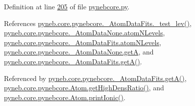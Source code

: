 Definition at line \hyperlink{pynebcore_8py_source_l00205}{205} of file \hyperlink{pynebcore_8py_source}{pynebcore.\+py}.



References \hyperlink{pynebcore_8py_source_l00171}{pyneb.\+core.\+pynebcore.\+\_\+\+Atom\+Data\+Fits.\+\_\+test\+\_\+lev()}, \hyperlink{pynebcore_8py_source_l00061}{pyneb.\+core.\+pynebcore.\+\_\+\+Atom\+Data\+None.\+atom\+N\+Levels}, \hyperlink{pynebcore_8py_source_l00148}{pyneb.\+core.\+pynebcore.\+\_\+\+Atom\+Data\+Fits.\+atom\+N\+Levels}, \hyperlink{pynebcore_8py_source_l00060}{pyneb.\+core.\+pynebcore.\+\_\+\+Atom\+Data\+None.\+get\+A}, and \hyperlink{pynebcore_8py_source_l00205}{pyneb.\+core.\+pynebcore.\+\_\+\+Atom\+Data\+Fits.\+get\+A()}.



Referenced by \hyperlink{pynebcore_8py_source_l00205}{pyneb.\+core.\+pynebcore.\+\_\+\+Atom\+Data\+Fits.\+get\+A()}, \hyperlink{pynebcore_8py_source_l01653}{pyneb.\+core.\+pynebcore.\+Atom.\+get\+High\+Dens\+Ratio()}, and \hyperlink{pynebcore_8py_source_l02167}{pyneb.\+core.\+pynebcore.\+Atom.\+print\+Ionic()}.


